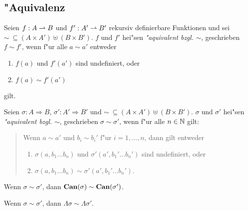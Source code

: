 \documentclass[12pt,a4paper]{article}
\begin{document}
\subsection{"Aquivalenz}

\begin{definition}
  Seien $f:A \rightharpoonup B$ und $f':A' \rightharpoonup B'$ rekursiv definierbare Funktionen und
  sei $\sim\ \subseteq (A \times A') \uplus (B \times B')$. $f$ und $f'$ hei"sen
  \emph{"aquivalent bzgl. $\sim$}, geschrieben $f \sim f'$, wenn f"ur
  alle $a \sim a'$ entweder
  \begin{enumerate}
  \item $f(a)$ und $f'(a')$ sind undefiniert, oder
  \item $f(a) \sim f'(a')$
  \end{enumerate}
  gilt.
\end{definition}

\begin{definition}
  Seien $\sigma:A \Rightarrow B$, $\sigma': A' \Rightarrow B'$ und $\sim\ \subseteq (A \times A') \uplus (B \times B')$.
  $\sigma$ und $\sigma'$ hei"sen \emph{"aquivalent bzgl. $\sim$}, geschrieben $\sigma \sim \sigma'$,
  wenn f"ur alle $n \in \mathbb N$ gilt:
  \begin{quote}
    Wenn $a \sim a'$ und $b_i \sim b_i'$ f"ur $i=1,\ldots,n$, dann gilt entweder
    \begin{enumerate}
    \item $\sigma(a,b_1 \ldots b_n)$ und $\sigma'(a',b_1' \ldots b_n')$ sind undefiniert, oder
    \item $\sigma(a,b_1 \ldots b_n) \sim \sigma'(a',b_1' \ldots b_n')$.
    \end{enumerate}
  \end{quote}
\end{definition}

\begin{corollary}
  Wenn $\sigma \sim \sigma'$, dann $\mathbf{Can}(\sigma) \sim \mathbf{Can}(\sigma')$.
\end{corollary}

\begin{corollary}
  Wenn $\sigma \sim \sigma'$, dann $\Lambda \sigma \sim \Lambda \sigma'$.
\end{corollary}
\end{document}
